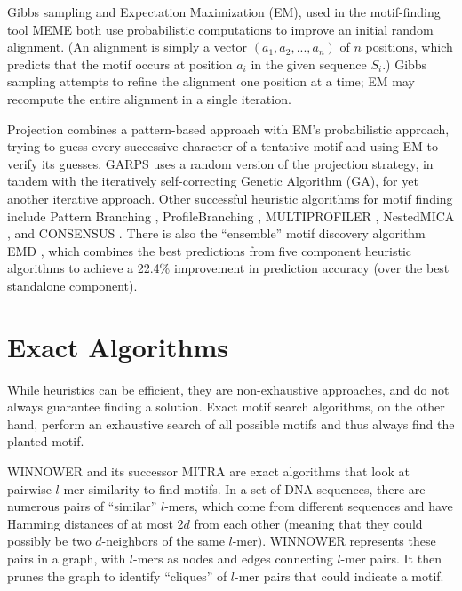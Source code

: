 \documentclass[oneside,12pt]{DISCSthesis}
\begin{document}
		Gibbs sampling \cite{lawrence1993detecting} and Expectation Maximization (EM), used in the motif-finding tool MEME \cite{lawrence1990expectation,bailey1995unsupervised} both use probabilistic computations to improve an initial random alignment. (An alignment is simply a vector $(a_{1}, a_{2},...,a_{n})$ of $n$ positions, which predicts that the motif occurs at position $a_{i}$ in the given sequence $S_{i}$.) Gibbs sampling attempts to refine the alignment one position at a time; %
		EM may recompute the entire alignment in a single iteration. 

		Projection \cite{blanchette2002discovery} combines a pattern-based approach with EM's probabilistic approach, trying to guess every successive character of a tentative motif and using EM to verify its guesses. GARPS \cite{huo2009combining} uses a random version of the projection strategy, in tandem with the iteratively self-correcting Genetic Algorithm (GA), for yet another iterative approach. Other successful heuristic algorithms for motif finding include Pattern Branching \cite{price2003finding}, ProfileBranching \cite{price2003finding}, MULTIPROFILER \cite{keich2002finding}, NestedMICA \cite{down2005nestedmica}, and CONSENSUS \cite{hertz1999identifying}. There is also the ``ensemble'' motif discovery algorithm EMD \cite{hu2006emd}, which combines the best predictions from five component heuristic algorithms to achieve a 22.4\% improvement in prediction accuracy (over the best standalone component).

	\section{Exact Algorithms}
		While heuristics can be efficient, they are non-exhaustive approaches, and do not always guarantee finding a solution. Exact motif search algorithms, on the other hand, perform an exhaustive search of all possible motifs and thus always find the planted motif.

		WINNOWER \cite{pevzner2000combinatorial} and its successor MITRA \cite{eskin2002finding} are exact algorithms that look at pairwise $l$-mer similarity to find motifs. In a set of DNA sequences, there are numerous pairs of ``similar'' $l$-mers, which come from different sequences and have Hamming distances of at most 2$d$ from each other (meaning that they could possibly be two $d$-neighbors of the same $l$-mer). WINNOWER represents these pairs in a graph, with $l$-mers as nodes and edges connecting $l$-mer pairs. It then prunes the graph to identify ``cliques'' of $l$-mer pairs that could indicate a motif.
\end{document}
